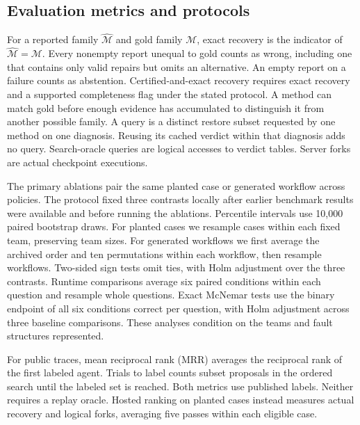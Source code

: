 \documentclass[11pt,letterpaper]{article}
\begin{document}
\subsection{Evaluation metrics and protocols}
For a reported family $\widehat{\mathcal M}$ and gold family $\mathcal M$, exact recovery is the indicator of $\widehat{\mathcal M}=\mathcal M$. Every nonempty report unequal to gold counts as wrong, including one that contains only valid repairs but omits an alternative. An empty report on a failure counts as abstention. Certified-and-exact recovery requires exact recovery and a supported completeness flag under the stated protocol. A method can match gold before enough evidence has accumulated to distinguish it from another possible family. A query is a distinct restore subset requested by one method on one diagnosis. Reusing its cached verdict within that diagnosis adds no query. Search-oracle queries are logical accesses to verdict tables. Server forks are actual checkpoint executions.

The primary ablations pair the same planted case or generated workflow across policies. The protocol fixed three contrasts locally after earlier benchmark results were available and before running the ablations. Percentile intervals use 10,000 paired bootstrap draws. For planted cases we resample cases within each fixed team, preserving team sizes. For generated workflows we first average the archived order and ten permutations within each workflow, then resample workflows. Two-sided sign tests omit ties, with Holm adjustment over the three contrasts. Runtime comparisons average six paired conditions within each question and resample whole questions. Exact McNemar tests use the binary endpoint of all six conditions correct per question, with Holm adjustment across three baseline comparisons. These analyses condition on the teams and fault structures represented.

For public traces, mean reciprocal rank (MRR) averages the reciprocal rank of the first labeled agent. Trials to label counts subset proposals in the ordered search until the labeled set is reached. Both metrics use published labels. Neither requires a replay oracle. Hosted ranking on planted cases instead measures actual recovery and logical forks, averaging five passes within each eligible case.
\end{document}
